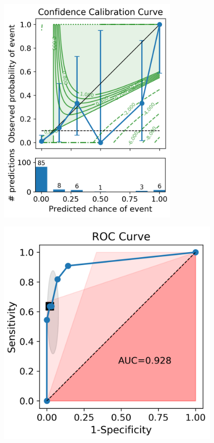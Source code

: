 \begin{figure}[]
\centering
\begin{minipage}{0.30\textwidth}
\centering
\includegraphics[width=0.79\textwidth] {figs/1.png}
\label{fig:ccc}
\end{minipage}%
\hspace{0.5em}
\begin{minipage}{0.30\textwidth}
\centering
\includegraphics[width=0.98\textwidth]{figs/2.png}

\end{minipage}
\end{figure}
